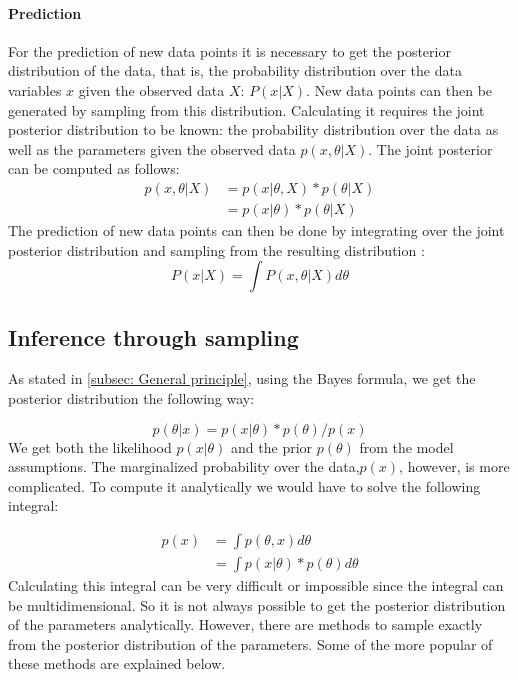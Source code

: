 \documentclass{article}
\begin{document}
\paragraph{Prediction}
For the prediction of new data points it is necessary to get the posterior distribution of the data, that is, the probability distribution over the data variables $x$ given the observed data $X$: $P(x|X)$. New data points can then be generated by sampling from this distribution. Calculating it requires the joint posterior distribution to be known: the probability distribution over the data as well as the parameters given the observed data $p(x,\theta|X)$. The joint posterior can be computed as follows:
\begin{equation}
\begin{aligned}
p(x,\theta|X) &	= p(x|\theta,X) * p(\theta|X) \\
 			& = p(x|\theta) * p(\theta|X)
\end{aligned}
\end{equation}
The prediction of new data points can then be done by integrating over the joint posterior distribution and sampling from the resulting distribution \cite{1439840954}:
\begin{equation}
P(x|X) = \int P(x,\theta|X) d\theta
\end{equation}

\subsection{Inference through sampling}
\label{subsec:sampling}
As stated in \ref{subsec: General principle}, using the Bayes formula, we get the posterior distribution the following way:

\begin{equation}
p(\theta|x) = p(x|\theta) * p(\theta) / p(x)
\end{equation}
We get both the likelihood $p(x|\theta)$ and the prior $p(\theta)$ from the model assumptions. The marginalized probability over the data,$p(x)$, however, is more complicated. To compute it analytically we would have to solve the following integral:

\begin{equation}
\begin{split}
p(x) &= \int p(\theta,x) d \theta \\
&=  \int p(x|\theta) * p(\theta) d \theta
\end{split}
\end{equation}
Calculating this integral can be very difficult or impossible since the integral can be multidimensional. So it is not always possible to get the posterior distribution of the parameters analytically. However, there are methods to sample exactly from the posterior distribution of the parameters. Some of the more popular of these methods are explained below.
\end{document}
